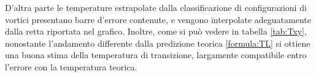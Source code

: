 \documentclass{article}
\begin{document}
D'altra parte le temperature estrapolate dalla classificazione di configurazioni di vortici presentano barre d'errore contenute, e vengono interpolate adeguatamente dalla retta riportata nel grafico.
Inoltre, come si può vedere in tabella \ref{tab:Txy}, nonostante l'andamento differente dalla predizione teorica \ref{formula:TL} si ottiene una buona stima della temperatura di transizione, largamente compatibile entro l'errore con la temperatura teorica.






\end{document}

